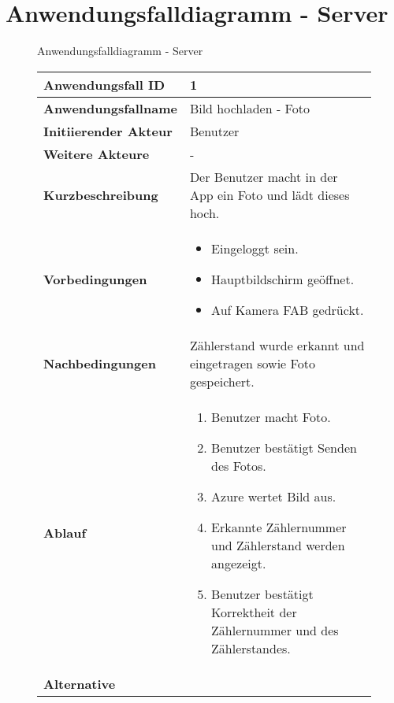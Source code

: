 \newpage



\section{Anwendungsfalldiagramm - Server}

\begin{figure}[h]
	\centering
	\caption{Anwendungsfalldiagramm - Server}
	\label{fig:anwendungsfalldiagramm-server}
\end{figure}

\newpage

\begin{figure}[h]
	\centering
	\begin{tabularx}{\textwidth}{ X | X }
		\textbf{Anwendungsfall ID} & 1 \\ \hline
		\textbf{Anwendungsfallname} & Bild hochladen  - Foto \\ \hline
		\textbf{Initiierender Akteur} & Benutzer \\ \hline
		\textbf{Weitere Akteure} & - \\ \hline
		\textbf{Kurzbeschreibung} & Der Benutzer macht in der App ein Foto und lädt dieses hoch.   \\ \hline
		\textbf{Vorbedingungen} & 
		\begin {itemize}
			\item Eingeloggt sein. 
			\item Hauptbildschirm geöffnet.
			\item Auf Kamera FAB gedrückt.
		\end{itemize} \\ \hline
		\textbf{Nachbedingungen} & Zählerstand wurde erkannt und eingetragen sowie Foto gespeichert.  \\ \hline
		\textbf{Ablauf} &
		\begin{enumerate}
			\item Benutzer macht Foto.
			\item Benutzer bestätigt Senden des Fotos.
			\item Azure wertet Bild aus.
			\item Erkannte Zählernummer und Zählerstand werden angezeigt.
			\item Benutzer bestätigt Korrektheit der Zählernummer und des Zählerstandes.
		\end{enumerate} \\ \hline
		\textbf{Alternative} &

\end{tabularx}
\end{figure}
